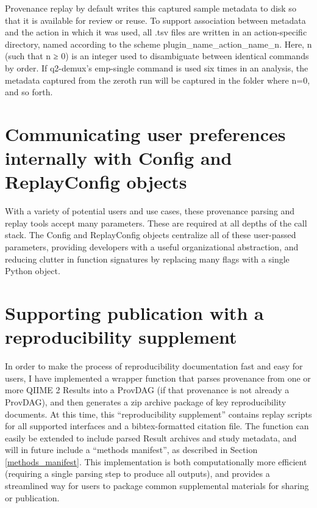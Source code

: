 Provenance replay by default writes this captured sample metadata to disk so
that it is available for review or reuse. To support association between
metadata and the action in which it was used, all .tsv files are written in an
action-specific directory, named according to the scheme
plugin\_name\_action\_name\_n. Here, n (such that n ≥ 0) is an integer used to
disambiguate between identical commands by order. If q2-demux’s emp-single
command is used six times in an analysis, the metadata captured from the zeroth
run will be captured in the folder where n=0, and so forth.


\section{Communicating user preferences internally with Config and ReplayConfig objects}

With a variety of potential users and use cases, these provenance parsing and
replay tools accept many parameters. These are required at all depths of the
call stack. The Config and ReplayConfig objects centralize all of these
user-passed parameters, providing developers with a useful organizational
abstraction, and reducing clutter in function signatures by replacing many flags
with a single Python object. 


\section{Supporting publication with a reproducibility supplement}

In order to make the process of reproducibility documentation fast and easy for
users, I have implemented a wrapper function that parses provenance from one or
more QIIME 2 Results into a ProvDAG (if that provenance is not already a
ProvDAG), and then generates a zip archive package of key reproducibility
documents. At this time, this “reproducibility supplement” contains replay
scripts for all supported interfaces and a bibtex-formatted citation file. The
function can easily be extended to include parsed Result archives and study
metadata, and will in future include a “methods manifest”, as described in
Section \ref{methods_manifest}. This implementation is both computationally more efficient
(requiring a single parsing step to produce all outputs), and provides a
streamlined way for users to package common supplemental materials for sharing
or publication.
